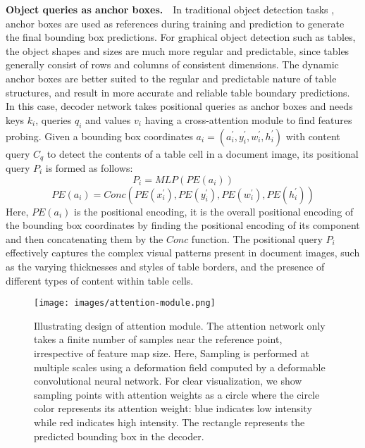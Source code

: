 \documentclass[sn-mathphys]{sn-jnl}\jyear{2021}\theoremstyle{thmstyleone}\newtheorem{theorem}{Theorem}\newtheorem{proposition}[theorem]{Proposition}\theoremstyle{thmstyletwo}\newtheorem{example}{Example}\newtheorem{remark}{Remark}\theoremstyle{thmstylethree}\newtheorem{definition}{Definition}\usepackage{amsmath}
\begin{document}
\noindent\textbf {Object queries as anchor boxes.}~~In traditional object detection tasks \cite{faster23, fast5}, anchor boxes are used as references during training and prediction to generate the final bounding box predictions. For graphical object detection such as tables, the object shapes and sizes are much more regular and predictable, since tables generally consist of rows and columns of consistent dimensions. The dynamic anchor boxes are better suited to the regular and predictable nature of table structures, and result in more accurate and reliable table boundary predictions.\\
In this case, decoder network takes positional queries as anchor boxes and needs keys $k_i$, queries $q_i$ and values $v_i$ having a cross-attention module to find features probing. Given a bounding box coordinates $a_i = (a^\prime_i, y^\prime_i , w^\prime_i, h^\prime_i )$ with content query $C_q$ to detect the contents of a table cell in a document image, its  positional query $P_i$ is formed as follows:  
\begin{equation}
 P_i= MLP (PE(a_i)) 
\end{equation}
\begin{equation}
\label{eqn:pe}
PE (a_i)=Conc(PE(x^\prime_i),PE(y^\prime_i),PE(w^\prime_i),PE(h^\prime_i)) 
\end{equation}
Here, $PE (a_i)$ is the positional encoding, it is the overall positional encoding of the bounding box coordinates by finding the positional encoding of its component and then concatenating them by the $Conc$ function. The positional query $P_i$ effectively captures the complex visual patterns present in document images, such as the varying thicknesses and styles of table borders, and the presence of different types of content within table cells.\\
\begin{figure*}[h]
\centering
\texttt{[image: images/attention-module.png]}
\caption{Illustrating design of attention module. The attention network only takes a finite number of samples near the reference point, irrespective of feature map size. Here, Sampling is performed at multiple scales using a deformation field computed by a deformable convolutional neural network. For clear visualization, we show sampling points with attention weights as a circle where the circle color represents its attention weight: blue indicates low intensity while red indicates high intensity. The rectangle represents the predicted bounding box in the decoder. }\label{fig:attention}
\end{figure*} 
\end{document}
